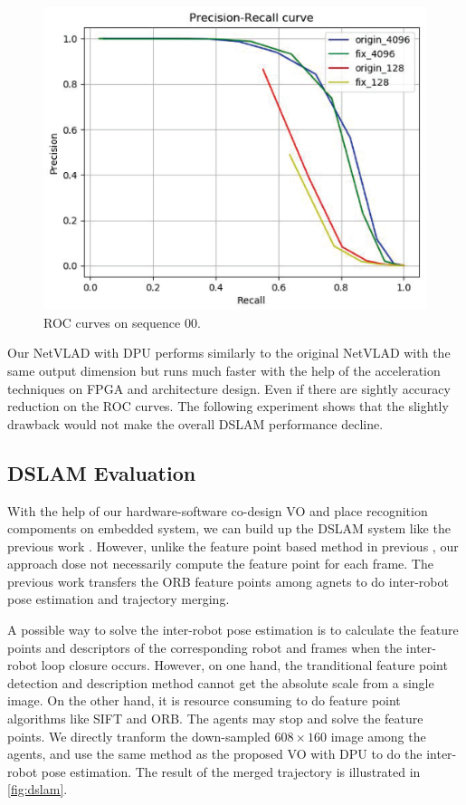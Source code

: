 \begin{figure}[t]
  \centering  
  \includegraphics[width=0.85\linewidth]{fig/val_reloc.eps}
  \caption{ROC curves on sequence 00.}
  \label{fig:reloc}
\end{figure}

Our NetVLAD with DPU performs similarly to the original NetVLAD with the same output dimension but runs much faster with the help of the acceleration techniques on FPGA and architecture design. Even if there are sightly accuracy reduction on the ROC curves. The following experiment shows that the slightly drawback would not make the overall DSLAM performance decline.

\subsection{DSLAM Evaluation}

With the help of our hardware-software co-design VO and place recognition compoments on embedded system, we can build up the DSLAM system like the previous work \cite{Cieslewski:20187ee}. However, unlike the feature point based method in previous \cite{Cieslewski:20187ee}, our approach dose not necessarily compute the feature point for each frame. The previous work \cite{Cieslewski:20187ee} transfers the ORB feature points among agnets to do inter-robot pose estimation and trajectory merging.


A possible way to solve the inter-robot pose estimation is to calculate the feature points and  descriptors of the corresponding robot and frames when the inter-robot loop closure occurs. However, on one hand, the tranditional feature point detection and description method cannot get the absolute scale from a single image. On the other hand, it is resource consuming to do feature point algorithms like SIFT\cite{Jegou:2010f45} and ORB\cite{Mur-Artal:2017281}. The agents may stop and solve the feature points. We directly tranform the down-sampled $608 \times 160$ image among the agents, and use the same method as the proposed VO with DPU to do the inter-robot pose estimation. The result of the merged trajectory is illustrated in \cref{fig:dslam}.


